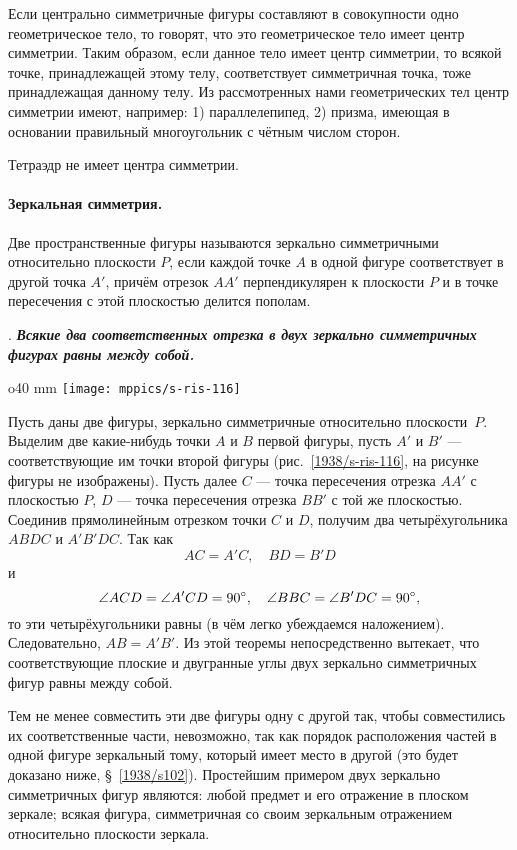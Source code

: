 Если центрально симметричные фигуры составляют в совокупности одно геометрическое тело, то говорят, что это геометрическое тело имеет центр симметрии.
Таким образом, если данное тело имеет центр симметрии, то всякой точке, принадлежащей этому телу, соответствует симметричная точка, тоже принадлежащая данному телу.
Из рассмотренных нами геометрических тел центр симметрии имеют, например: 1) параллелепипед, 2) призма, имеющая в основании правильный многоугольник с чётным числом сторон.

Тетраэдр не имеет центра симметрии.

\paragraph{Зеркальная симметрия.}\label{1938/s100}
Две пространственные фигуры называются зеркально симметричными относительно плоскости $P$, если каждой точке $A$ в одной фигуре соответствует в другой точка $A'$, причём отрезок $AA'$ перпендикулярен к плоскости $P$ и в точке пересечения с этой плоскостью делится пополам.

\medskip

.
\textbf{\emph{Всякие два соответственных отрезка в двух зеркально симметричных фигурах равны между собой.}}

\begin{wrapfigure}{o}{40 mm}
\vskip-0mm
\centering
\texttt{[image: mppics/s-ris-116]}
\caption{}\label{1938/s-ris-116}
\vskip-0mm
\end{wrapfigure}

Пусть даны две фигуры, зеркально симметричные относительно плоскости~$P$.
Выделим две какие-нибудь точки $A$ и $B$ первой фигуры, пусть $A'$ и $B'$ — соответствующие им точки второй фигуры (рис.~\ref{1938/s-ris-116}, на рисунке фигуры не изображены).
Пусть далее $C$ — точка пересечения отрезка $AA'$ с плоскостью $P$, $D$ — точка пересечения отрезка $BB'$ с той же плоскостью.
Соединив прямолинейным отрезком точки $C$ и $D$, получим два четырёхугольника $ABDC$ и $A'B'DC$.
Так как \[AC = A'C,\quad BD = B'D\] 
и 
\[\angle ACD = \angle A'CD=90\degree,\quad  \angle BBC = \angle B'DC=90\degree,\] то эти четырёхугольники равны (в чём легко убеждаемся наложением).
Следовательно, $AB=A'B'$.
Из этой теоремы непосредственно вытекает, что соответствующие плоские и двугранные углы двух зеркально симметричных фигур равны между собой.

Тем не менее совместить эти две фигуры одну с другой так, чтобы совместились их соответственные части, невозможно, так как порядок расположения частей в одной фигуре зеркальный тому, который имеет место в другой (это будет доказано ниже, §~\ref{1938/s102}).
Простейшим примером двух зеркально симметричных фигур являются: любой предмет и его отражение в плоском зеркале;
всякая фигура, симметричная со своим зеркальным отражением относительно плоскости зеркала.

